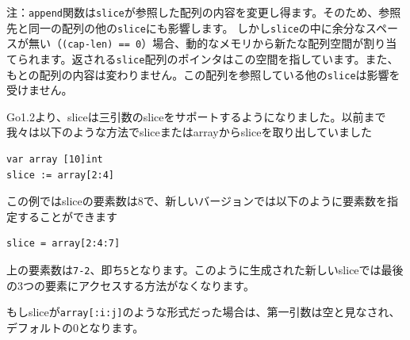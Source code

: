 注：\texttt{append}関数は\texttt{slice}が参照した配列の内容を変更し得ます。そのため、参照先と同一の配列の他の\texttt{slice}にも影響します。 しかし\texttt{slice}の中に余分なスペースが無い（\texttt{(cap-len) == 0}）場合、動的なメモリから新たな配列空間が割り当てられます。返される\texttt{slice}配列のポインタはこの空間を指しています。また、もとの配列の内容は変わりません。この配列を参照している他の\texttt{slice}は影響を受けません。

Go1.2より、sliceは三引数のsliceをサポートするようになりました。以前まで我々は以下のような方法でsliceまたはarrayからsliceを取り出していました

\begin{lstlisting}[numbers=none]
var array [10]int
slice := array[2:4]
\end{lstlisting}

この例ではsliceの要素数は8で、新しいバージョンでは以下のように要素数を指定することができます

\begin{lstlisting}[numbers=none]
slice = array[2:4:7]
\end{lstlisting}

上の要素数は\texttt{7-2}、即ち\texttt{5}となります。このように生成された新しいsliceでは最後の3つの要素にアクセスする方法がなくなります。

もしsliceが\texttt{array[:i:j]}のような形式だった場合は、第一引数は空と見なされ、デフォルトの0となります。


